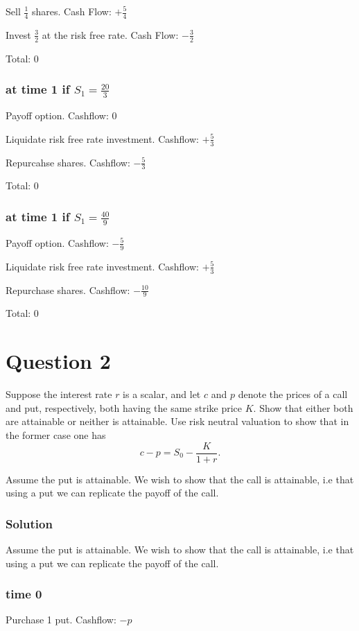\documentclass{unswmaths}
\begin{document}
Sell $ \frac{1}{4} $ shares. \hfill Cash Flow: $+\frac{5}{4} $

Invest $ \frac{3}{2} $ at the risk free rate. \hfill Cash Flow: $-\frac{3}{2} $

\hfill Total: $ 0 $

\subsubsection*{at time 1 if $ S_1 = \frac{20}{3} $}
Payoff option. \hfill Cashflow: $0$

Liquidate risk free rate investment. \hfill Cashflow: $+\frac{5}{3}$

Repurcahse shares. \hfill Cashflow: $-\frac{5}{3}$

\hfill Total: $ 0 $

\subsubsection*{at time 1 if $ S_1 = \frac{40}{9} $}
Payoff option. \hfill Cashflow: $-\frac{5}{9}$

Liquidate risk free rate investment. \hfill Cashflow: $+\frac{5}{3} $

Repurchase shares. \hfill Cashflow: $-\frac{10}{9}$

\hfill Total: $0$

\section*{Question 2}
Suppose the interest rate $r$ is a scalar, and let $c$ and $p$ denote the prices of a call and
put, respectively, both having the same strike price $K$. Show that either both are
attainable or neither is attainable. Use risk neutral valuation to show that in the
former case one has
$$
    c - p = S_0 - \frac{K}{1+r}.
$$

Assume the put is attainable. We wish to show that the call is attainable, i.e that using a put
we can replicate the payoff of the call.

\subsubsection*{Solution}
Assume the put is attainable. We wish to show that the call is attainable, i.e that using a put
we can replicate the payoff of the call.

\subsubsection*{time 0}
Purchase 1 put. \hfill Cashflow: $-p $
\end{document}
